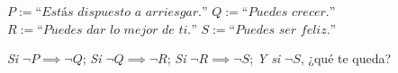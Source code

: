 \newpage
\vspace*{\fill}

\large
\noindent
$P := \textit{``Estás dispuesto a arriesgar.''}$
\newline
$Q := \textit{``Puedes crecer.''}$
\newline
$R := \textit{``Puedes dar lo mejor de ti.''}$
\newline
$S := \textit{``Puedes ser feliz.''}$
\newline
\newline

\noindent
\textit{Si} $\neg P \implies \neg Q$;
\newline
\textit{Si} $\neg Q \implies \neg R$;
\newline
\textit{Si} $\neg R \implies \neg S$;
\newline
\textit{Y si} $\neg S$, ¿qué te queda?
\newline



\vspace*{\fill}